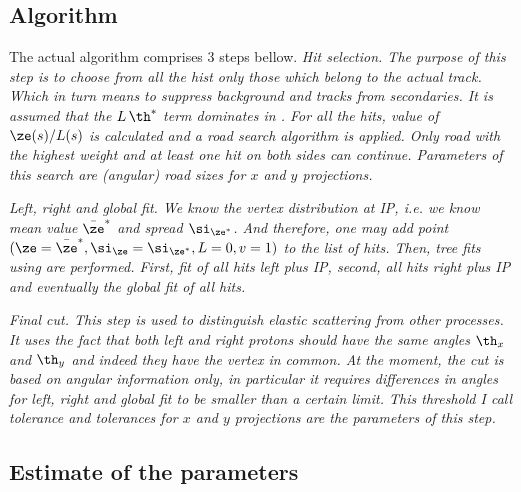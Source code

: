 \iffalse
In case of symmetric optic, i.e.
$$L(-s) = - L(s),\qquad v(-s) = v(s)\eqno(3)$$
and symmetric measurement (simultaneously at $\pm 216$ and/or $\pm220$) one gets condition $\sum Lv = 0$. It simplifies the general formula (2) to
$$\pmatrix{\ze^*\cr\th^*} = \pmatrix{\sum \ze v / \sum v^2\cr \sum \ze L / \sum L^2}.\eqno{(4)}$$
The expression for $\th^*$ can be further expanded
$$\th^* = {1\over 2} {L(216) \big(\ze(216) - \ze(-216)\big)\ +\ L(220)\big( \ze(220) - \ze(-220) \big) \over L^2(216) + L^2(220)}\eqno{(5)}$$
\fi

\subsection{Algorithm}

The actual algorithm comprises 3 steps bellow.
\bitm
\itm \em{Hit selection}. The purpose of this step is to choose from all the hist only those which belong to the actual track. Which in turn means to suppress background and tracks from secondaries. It is assumed that the $L\,\th^*$ term dominates in . For all the hits, value of $\ze(s) / L(s)$ is calculated and a road search algorithm is applied. Only road with the highest weight and at least one hit on both sides can continue.
\itmpar Parameters of this search are (angular) road sizes for $x$ and $y$ projections.

\itm \em{Left, right and global fit}. We know the vertex distribution at IP, i.e\hbox{.} we know mean value $\bar\ze^*$ and spread $\si_{\ze^*}$. And therefore, one may add point $(\ze = \bar\ze^*, \si_\ze = \si_{\ze^*}, L = 0, v = 1)$ to the list of hits. Then, tree fits using  are performed. First, fit of all hits left plus IP, second, all hits right plus IP and eventually the global fit of all hits.

\itm \em{Final cut}. This step is used to distinguish elastic scattering from other processes. It uses the fact that both left and right protons should have the same angles $\th_x$ and $\th_y$ and indeed they have the vertex in common. At the moment, the cut is based on angular information only, in particular it requires differences in angles for left, right and global fit to be smaller than a certain limit. This threshold I call tolerance and tolerances for $x$ and $y$ projections are the parameters of this step.
\eitm


\subsection{Estimate of the parameters}


